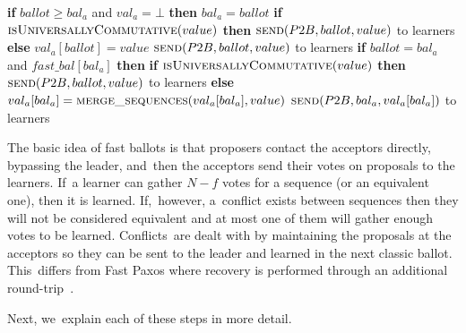 \documentclass[algorithms,article,accept,moreauthors,pdftex,10pt,a4paper]{Definitions/mdpi}
\begin{document}
\begin{algorithm}[H]
\begin{algorithmic}[1]
\EndFunction
\State
{}
\State \textbf{if} $ballot \geq bal_a$ and $val_a = \bot$ \textbf{then}
\State \hspace{\algorithmicindent} $bal_a = ballot$
\State \hspace{\algorithmicindent} \textbf{if} $\Call{isUniversallyCommutative}{value}$ \textbf{then}
\State \hspace{\algorithmicindent}\hspace{\algorithmicindent} $\Call{send}{P2B, ballot, value}$ to learners
\State \hspace{\algorithmicindent}\textbf{else}
\State \hspace{\algorithmicindent}\hspace{\algorithmicindent} $val_a[ballot] = value$
\State \hspace{\algorithmicindent}\hspace{\algorithmicindent} $\Call{send}{P2B, ballot, value}$ to learners
\EndFunction
\State
{}
\State \textbf{if} $ballot = bal_a$ and $fast\_bal[bal_a]$ \textbf{then}
\State \hspace{\algorithmicindent} \textbf{if} $\Call{isUniversallyCommutative}{value}$ \textbf{then}
\State \hspace{\algorithmicindent}\hspace{\algorithmicindent} $\Call{send}{P2B, ballot, value}$ to learners
\State \hspace{\algorithmicindent}\textbf{else}
\State \hspace{\algorithmicindent}\hspace{\algorithmicindent} $val_a[bal_a] = \Call{merge\_sequences}{val_a[bal_a], value}$
\State \hspace{\algorithmicindent}\hspace{\algorithmicindent} $\Call{send}{P2B, bal_a, val_a[bal_a]}$ to learners
\EndFunction
\end{algorithmic}
\end{algorithm}

The basic idea of fast ballots is that proposers contact the acceptors directly, bypassing the leader, and~then the acceptors send their votes on proposals to the learners. If~a learner can gather $N-f$ votes for a sequence (or an equivalent one), then it is learned. If,~however, a~conflict exists between sequences then they will not be considered equivalent and at most one of them will gather enough votes to be learned. Conflicts~are dealt with by maintaining the proposals at the acceptors so they can be sent to the leader and learned in the next classic ballot. This~differs from Fast Paxos where recovery is performed through an additional round-trip~\cite{L06}. \par
Next, we~explain each of these steps in more detail.
\end{document}
